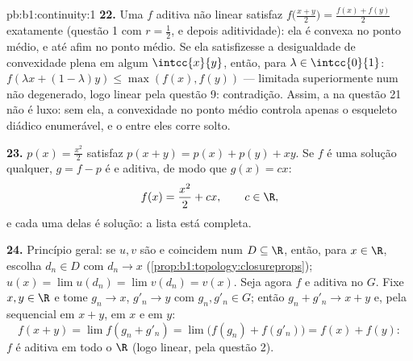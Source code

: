 \begin{solution}{pb:b1:continuity:1}
\textbf{22.} Uma $f$ aditiva não linear satisfaz
$f\bigl(\frac{x+y}{2}\bigr) = \frac{f(x) + f(y)}{2}$ exatamente
(questão 1 com $r = \frac12$, e depois aditividade): ela é
convexa no ponto médio, e até afim no ponto médio. Se ela satisfizesse a
desigualdade de convexidade plena em algum  $\intcc{x}{y}$, então,
para $\lambda \in \intcc{0}{1}$: $f(\lambda x + (1-\lambda)y) \leq
\max(f(x), f(y))$ --- limitada superiormente num  não degenerado,
logo linear pela questão 9: contradição. Assim, a  na
questão 21 não é luxo: sem ela, a convexidade no ponto médio
controla apenas o esqueleto diádico enumerável, e o 
entre eles corre solto.

\textbf{23.} $p(x) = \frac{x^2}{2}$ satisfaz $p(x+y) = p(x) +
p(y) + xy$. Se $f$ é uma solução  qualquer, $g = f - p$ é
 e aditiva, de modo que $g(x) = cx$:
\[
f(x) = \frac{x^2}{2} + cx , \qquad c \in \R ,
\]
e cada uma delas é solução: a lista está completa.

\textbf{24.} Princípio geral: se $u, v$ são  e
coincidem num   $D \subseteq \R$, então, para $x \in \R$, escolha
$d_n \in D$ com $d_n \to x$
(\cref{prop:b1:topology:closureprops}); $u(x) = \lim u(d_n) =
\lim v(d_n) = v(x)$. Seja agora $f$  e aditiva no
  $G$. Fixe $x, y \in \R$ e tome $g_n \to x$,
$g'_n \to y$ com $g_n, g'_n \in G$; então $g_n + g'_n \to x + y$
e, pela  sequencial em $x + y$, em $x$ e em $y$:
\[
f(x + y) = \lim f(g_n + g'_n) = \lim\bigl(f(g_n) +
f(g'_n)\bigr) = f(x) + f(y) :
\]
$f$ é aditiva em todo o $\R$ (logo linear, pela questão 2).


\end{solution}
